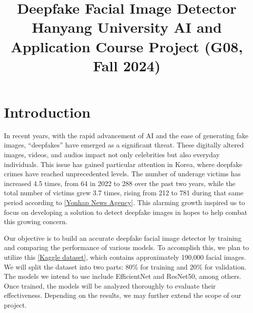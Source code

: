 \documentclass[conference]{IEEEtran}
\begin{document}
\title{Deepfake Facial Image Detector\\
{\large Hanyang University AI and Application Course Project (G08, Fall 2024)}}

\author{
\and
{}
\and
{}
\and
{}
}


\maketitle

\section*{Introduction}
In recent years, with the rapid advancement of AI and the ease of generating fake images, “deepfakes” have emerged as a significant threat. These digitally altered images, videos, and audios impact not only celebrities but also everyday individuals. This issue has gained particular attention in Korea, where deepfake crimes have reached unprecedented levels. The number of underage victims has increased 4.5 times, from 64 in 2022 to 288 over the past two years, while the total number of victims grew 3.7 times, rising from 212 to 781 during that same period according to \href{https://en.yna.co.kr/view/AEN20240828003100315}{[Yonhap News Agency]}. This alarming growth inspired us to focus on developing a solution to detect deepfake images in hopes to help combat this growing concern.

Our objective is to build an accurate deepfake facial image detector by training and comparing the performance of various models. To accomplish this, we plan to utilize this \href{https://www.kaggle.com/datasets/manjilkarki/deepfake-and-real-images}{[Kaggle dataset]}, which contains approximately 190,000 facial images. We will split the dataset into two parts: 80\% for training and 20\% for validation. The models we intend to use include EfficientNet and ResNet50, among others. Once trained, the models will be analyzed thoroughly to evaluate their effectiveness. Depending on the results, we may further extend the scope of our project.
\end{document}
